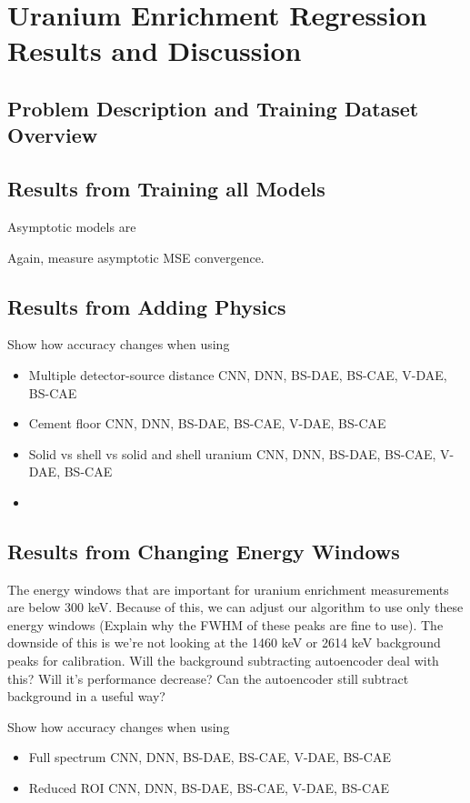 \chapter{Uranium Enrichment Regression Results and Discussion}

\section{Problem Description and Training Dataset Overview}



\section{Results from Training all Models}


Asymptotic models are 


Again, measure asymptotic MSE convergence.



\section{Results from Adding Physics}

Show how accuracy changes when using
\begin{itemize}
    \item Multiple detector-source distance
    \subitem CNN, DNN, BS-DAE, BS-CAE, V-DAE, BS-CAE
    \item Cement floor
    \subitem CNN, DNN, BS-DAE, BS-CAE, V-DAE, BS-CAE
    \item Solid vs shell vs solid and shell uranium
    \subitem CNN, DNN, BS-DAE, BS-CAE, V-DAE, BS-CAE
    \item 
\end{itemize}

\section{Results from Changing Energy Windows}

The energy windows that are important for uranium enrichment measurements are below 300 keV. Because of this, we can adjust our algorithm to use only these energy windows (Explain why the FWHM of these peaks are fine to use). The downside of this is we're not looking at the 1460 keV or 2614 keV background peaks for calibration. Will the background subtracting autoencoder deal with this? Will it's performance decrease? Can the autoencoder still subtract background in a useful way?

Show how accuracy changes when using
\begin{itemize}
    \item Full spectrum
    \subitem CNN, DNN, BS-DAE, BS-CAE, V-DAE, BS-CAE
    \item Reduced ROI
    \subitem CNN, DNN, BS-DAE, BS-CAE, V-DAE, BS-CAE
\end{itemize}






